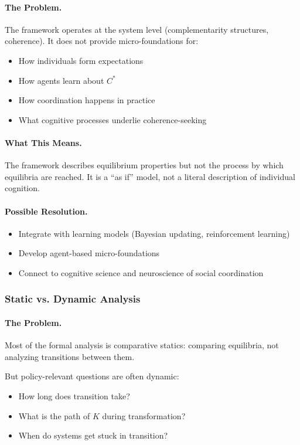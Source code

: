 \documentclass[12pt,a4paper]{article}
\begin{document}
\paragraph{The Problem.}
The framework operates at the system level (complementarity structures, coherence).
It does not provide micro-foundations for:
\begin{itemize}
  \item How individuals form expectations
  \item How agents learn about $C^*$
  \item How coordination happens in practice
  \item What cognitive processes underlie coherence-seeking
\end{itemize}

\paragraph{What This Means.}
The framework describes equilibrium properties but not the process
by which equilibria are reached. It is a ``as if'' model, not a
literal description of individual cognition.

\paragraph{Possible Resolution.}
\begin{itemize}
  \item Integrate with learning models (Bayesian updating, reinforcement learning)
  \item Develop agent-based micro-foundations
  \item Connect to cognitive science and neuroscience of social coordination
\end{itemize}

\subsubsection{Static vs. Dynamic Analysis}

\paragraph{The Problem.}
Most of the formal analysis is comparative statics:
comparing equilibria, not analyzing transitions between them.

But policy-relevant questions are often dynamic:
\begin{itemize}
  \item How long does transition take?
  \item What is the path of $K$ during transformation?
  \item When do systems get stuck in transition?
\end{itemize}
\end{document}
